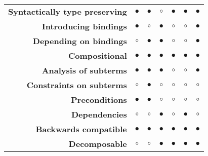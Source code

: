 {\begin{landscape}
\begin{table}[h]
\begin{tabular}{rcccccc}
{\bf Syntactically type preserving}  & $\bullet$             & $\bullet$     & $\circ$             & $\bullet$             & $\bullet$         & $\bullet$             \\
{\bf Introducing bindings}               & $\bullet$             & $\circ$       & $\bullet$           & $\circ$               & $\circ$           & $\bullet$             \\
{\bf Depending on bindings}            & $\circ$               & $\bullet$     & $\bullet$           & $\circ$               & $\circ$           & $\bullet$             \\
{\bf Compositional}                        & $\bullet$             & $\bullet$     & $\bullet$           & $\bullet$             & $\bullet$         & $\bullet$             \\
{\bf Analysis of subterms}              & $\bullet$             & $\bullet$     & $\bullet$           & $\circ$               & $\circ$           & $\bullet$             \\
{\bf Constraints on subterms}         & $\circ$               & $\bullet$     & $\circ$             & $\circ$               & $\circ$           & $\circ$               \\
{\bf Preconditions}                         & $\bullet$             & $\bullet$     & $\circ$             & $\circ$               & $\circ$           & $\circ$               \\
{\bf Dependencies}                        & $\circ$               & $\circ$       & $\bullet$           & $\circ$               & $\bullet$         & $\circ$               \\
{\bf Backwards compatible}             & $\bullet$             & $\bullet$     & $\bullet$           & $\bullet$             & $\bullet$         & $\bullet$             \\
{\bf Decomposable}                                & $\circ$               & $\circ$       & $\bullet$           & $\bullet$             & $\bullet$         & $\bullet$             \\ \hline
\end{tabular}
\vspace*{0.5cm}
\newline


\end{table}
\end{landscape}}

